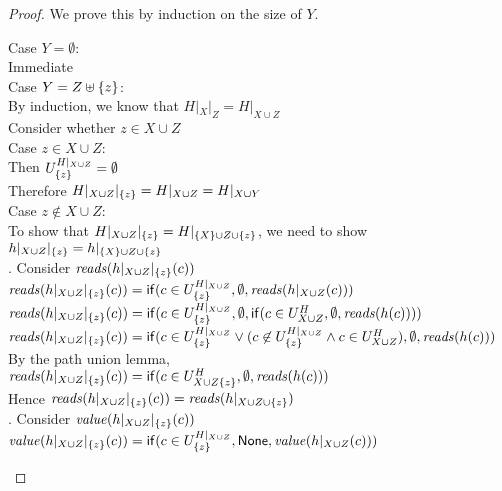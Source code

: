 \begin{proof}
We prove this by induction on the size of $Y$. 
\begin{tabbedproof}
\oo Case $Y = \emptyset$: \\
\ooo Immediate \\
\oo Case $Y = Z \uplus \{{z}\}$: \\
\ooo By induction, we know that $H|_X|_Z = H|_{X \cup Z}$ \\
\ooo Consider whether $z \in X \cup Z$ \\
\ooo Case $z \in X \cup Z$: \\
\oooo Then $U^{H|_{X \cup Z}}_{\{{z}\}} = \emptyset$ \\
\oooo Therefore $H|_{X \cup Z}|_{\{{z}\}} = H|_{X \cup Z} = H|_{X \cup Y}$  \\ 
\ooo Case $z \not\in X \cup Z$: \\
\oooo To show that $H|_{X \cup Z}|_{\{{z}\}} = H|_{\{{X}\} \cup Z \cup \{{z}\}} $, we need to show $h|_{X \cup Z}|_{\{{z}\}} = h|_{\{{X}\} \cup Z \cup \{{z}\}}$ \\
. Consider $\mathit{reads}(h|_{X \cup Z}|_{\{{z}\}}(c))$ \\
\ooooo $\mathit{reads}(h|_{X \cup Z}|_{\{{z}\}}(c)) = \mathsf{if}({c \in U^{H|_{X \cup Z}}_{\{{z}\}}}, {\emptyset}, {\mathit{reads}(h|_{X \cup Z}(c))})$ \\
\ooooo $\mathit{reads}(h|_{X \cup Z}|_{\{{z}\}}(c)) = \mathsf{if}({c \in U^{H|_{X \cup Z}}_{\{{z}\}}}, {\emptyset}, {\mathsf{if}({c \in U^H_{X \cup Z}}, {\emptyset}, {\mathit{reads}(h(c))})})$ \\
\ooooo $\mathit{reads}(h|_{X \cup Z}|_{\{{z}\}}(c)) = \mathsf{if}({c \in U^{H|_{X \cup Z}}_{\{{z}\}} \vee (c \not\in U^{H|_{X \cup Z}}_{\{{z}\}} \land c \in U^H_{X \cup Z})}, {\emptyset}, {\mathit{reads}(h(c))})$ \\
\ooooo By the path union lemma, \\
\ooooox $\mathit{reads}(h|_{X \cup Z}|_{\{{z}\}}(c)) = \mathsf{if}({c \in U^H_{X \cup Z \{{z}\}}}, {\emptyset}, {\mathit{reads}(h(c))})$ \\
\ooooo Hence $\mathit{reads}(h|_{X \cup Z}|_{\{{z}\}}(c)) = \mathit{reads}(h|_{X \cup Z \cup \{{z}\}})$ \\
. Consider $\mathit{value}(h|_{X \cup Z}|_{\{{z}\}}(c))$ \\
\ooooo $\mathit{value}(h|_{X \cup Z}|_{\{{z}\}}(c)) = \mathsf{if}({c \in U^{H|_{X \cup Z}}_{\{{z}\}}}, {\mathsf{None}}, {\mathit{value}(h|_{X \cup Z}(c))})$ \\

\end{tabbedproof}
\end{proof}
